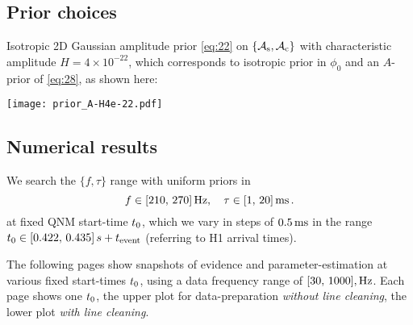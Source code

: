 \documentclass[aps,prd,onecolumn,notitlepage,nofootinbib,superscriptaddress,altaffilletter,floatfix]{revtex4-1}
\begin{document}
\subsection{Prior choices}
\label{sec:prior-choices}

Isotropic 2D Gaussian amplitude prior \eqref{eq:22} on $\{\mathcal{A}_{\mathrm{s}},\mathcal{A}_{\mathrm{c}}\}$ with characteristic amplitude $H = 4\times10^{-22}$, which corresponds to
isotropic prior in $\phi_0$ and an $A$-prior of \eqref{eq:28}, as shown here:\\
\parbox{\textwidth}{
  \centering
  \texttt{[image: prior\_A-H4e-22.pdf]}
}

\subsection{Numerical results}
\label{sec:numerical-results}

We search the $\{f,\tau\}$ range with uniform priors in
\begin{equation}
  \label{eq:33}
  f\in[210,\,270]\,\mathrm{Hz},\quad
  \tau\in[1,\,20]\,\mathrm{ms}\,.
\end{equation}
at fixed QNM start-time $t_0$, which we vary in steps of $0.5\,\mathrm{ms}$ in the range $t_0\in [0.422,\,0.435]\,s + t_{\mathrm{event}}$
(referring to H1 arrival times).

The following pages show snapshots of evidence and parameter-estimation at various fixed start-times $t_0$, using a data frequency range of $[30,\,1000],\mathrm{Hz}$.
Each page shows one $t_0$, the upper plot for data-preparation \emph{without line cleaning}, the lower plot \emph{with line cleaning}.
\end{document}
